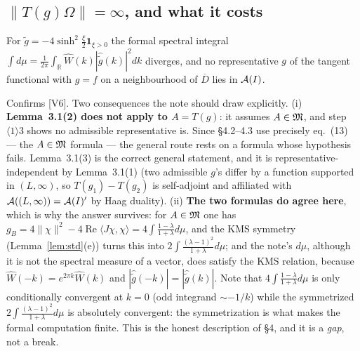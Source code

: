 \documentclass[11pt]{article}
\begin{document}
\subsection{$\|T(g)\Omega\|=\infty$, and what it costs}\label{sec:normdiv}
\begin{proposition}\label{prop:infnorm}
For $\widetilde g=-4\sinh^2\frac\xi2\mathbf 1_{\xi>0}$ the formal spectral integral
$\int d\mu=\frac1{2\pi}\int_{\mathbb R}\widehat W(k)|\widehat{\widetilde g}(k)|^2dk$ diverges, and no representative
$g$ of the tangent functional with $g=f$ on a neighbourhood of $\overline D$ lies in $\mathcal A(I)$.
\end{proposition}
\begin{verdictgap}
Confirms [V6].  Two consequences the note should draw explicitly.
(i) \textbf{Lemma~3.1(2) does not apply to $A=T(g)$}: it assumes $A\in\mathfrak M$, and step $\langle1\rangle3$ shows no
admissible representative is.  Since \S4.2--4.3 use precisely eq.~(13) --- the $A\in\mathfrak M$ formula --- the general
route rests on a formula whose hypothesis fails.  Lemma~3.1(3) is the correct general statement, and it is
representative-independent by Lemma~3.1(1) (two admissible $g$'s differ by a function supported in $(L,\infty)$,
so $T(g_1)-T(g_2)$ is self-adjoint and affiliated with $\mathcal A((L,\infty))=\mathcal A(I)'$ by Haag duality).
(ii) \textbf{The two formulas do agree here}, which is why the answer survives: for $A\in\mathfrak M$ one has
$g_B=4\|\chi\|^2-4\operatorname{Re}\langle J\chi,\chi\rangle=4\int\frac{1-\lambda}{1+\lambda}d\mu$, and the KMS
symmetry (Lemma~\ref{lem:std}(e)) turns this into $2\int\frac{(\lambda-1)^2}{1+\lambda}d\mu$; and the note's
$d\mu$, although it is not the spectral measure of a vector, does satisfy the KMS relation, because
$\widehat W(-k)=e^{2\pi k}\widehat W(k)$ and $|\widehat{\widetilde g}(-k)|=|\widehat{\widetilde g}(k)|$.  Note that
$4\int\frac{1-\lambda}{1+\lambda}d\mu$ is only conditionally convergent at $k=0$ (odd integrand $\sim -1/k$) while
the symmetrized $2\int\frac{(\lambda-1)^2}{1+\lambda}d\mu$ is absolutely convergent: the symmetrization is what
makes the formal computation finite.  This is the honest description of \S4, and it is a \emph{gap}, not a break.
\end{verdictgap}
\end{document}
